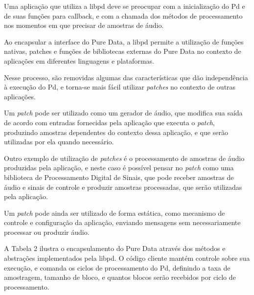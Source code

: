 \documentclass[a4paper, 11pt, twoside]{article}
\begin{document}
\begin{multicols}{2}
Uma aplicação que utiliza a libpd deve se preocupar com a inicialização do Pd
e de suas funções para callback, e com a chamada dos métodos 
de processamento nos momentos em que precisar de amostras de áudio.

Ao encapsular a interface do Pure Data, a libpd
permite a utilização de funções nativas, patches e funções de 
bibliotecas externas do Pure Data no contexto de aplicações em 
diferentes linguagens e plataformas.

Nesse processo, são removidas algumas das características
que dão independência à execução do Pd, e torna-se 
mais fácil utilizar \textit{patches} no contexto de outras aplicações.

Um \textit{patch} pode ser utilizado como um gerador de áudio,
que modifica sua saída de acordo com entradas fornecidas pela
aplicação que executa o \textit{patch}, produzindo amostras 
dependentes do contexto dessa aplicação, e que serão utilizadas 
por ela quando necessário.

Outro exemplo de utilização de \textit{patches} é o processamento de
amostras de áudio produzidas pela aplicação, e neste caso é possível
pensar no \textit{patch} como uma biblioteca de Processamento Digital
de Sinais, que pode receber amostras de áudio e sinais de controle e produzir
amostras processadas, que serão utilizadas pela aplicação.

Um \textit{patch} pode ainda ser utilizado de forma estática, como 
mecanismo de controle e configuração da aplicação, enviando mensagens
sem necessariamente processar ou produzir áudio.

A Tabela 2 ilustra o encapsulamento do Pure Data através dos
métodos e abstrações implementados pela libpd. O código cliente
mantém controle sobre sua execução, e comanda os ciclos de 
processamento do Pd, definindo a taxa de amostragem, tamanho
de bloco, e quantos blocos serão recebidos por ciclo de processamento.


\end{multicols}
\end{document}
